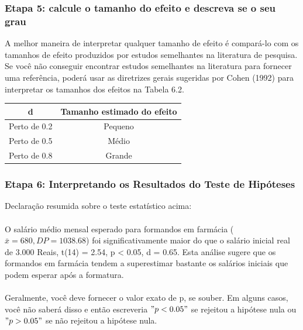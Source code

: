 \documentclass[11pt]{beamer}
\begin{document}
\begin{frame}
\frametitle{Etapa 5: calcule o tamanho do efeito e descreva se o seu grau}
A melhor maneira de interpretar qualquer tamanho de efeito é compará-lo com os tamanhos de efeito produzidos por estudos semelhantes na literatura de pesquisa. Se você não conseguir encontrar estudos semelhantes na literatura para fornecer uma referência, poderá usar as diretrizes gerais sugeridas por Cohen (1992) para interpretar os tamanhos dos efeitos na Tabela 6.2.

\begin{center}
\begin{tabular}{cc} 
 \hline
d  & Tamanho estimado do efeito\\
 \hline
Perto de 0.2 & Pequeno \\
Perto de 0.5 & Médio \\
Perto de 0.8 & Grande \\
 \hline
\end{tabular}
\end{center}   

\end{frame}

\begin{frame}
\frametitle{Etapa 6: Interpretando os Resultados do Teste de Hipóteses}

Declaração resumida sobre o teste estatístico acima:\\~\\

O salário médio mensal esperado para formandos em farmácia ($\bar{x} = 680, DP = 1038.68$) foi significativamente maior do que o salário inicial real de 3.000 Reais, t(14) = 2.54, p < 0.05, d = 0.65. Esta análise sugere que os formandos em farmácia tendem a superestimar bastante os salários iniciais que podem esperar após a formatura.\\~\\

Geralmente, você deve fornecer o valor exato de p, se souber. Em alguns casos, você não saberá disso e então escreveria \("p < 0.05"\) se rejeitou a hipótese nula ou \("p > 0.05"\) se não rejeitou a hipótese nula.
\end{frame}
\end{document}
